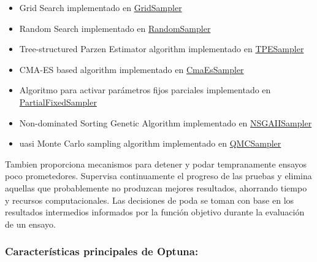 \documentclass[11pt]{article}
\providecommand{\tightlist}{%
      \setlength{\itemsep}{0pt}\setlength{\parskip}{0pt}}
\begin{document}
\begin{itemize}
\tightlist
\item
  Grid Search implementado en
  \href{https://optuna.readthedocs.io/en/stable/reference/samplers/generated/optuna.samplers.GridSampler.html\#optuna.samplers.GridSampler}{GridSampler}
\item
  Random Search implementado en
  \href{https://optuna.readthedocs.io/en/stable/reference/samplers/generated/optuna.samplers.RandomSampler.html\#optuna.samplers.RandomSampler}{RandomSampler}
\item
  Tree-structured Parzen Estimator algorithm implementado en
  \href{https://optuna.readthedocs.io/en/stable/reference/samplers/generated/optuna.samplers.TPESampler.html\#optuna.samplers.TPESampler}{TPESampler}
\item
  CMA-ES based algorithm implementado en
  \href{https://optuna.readthedocs.io/en/stable/reference/samplers/generated/optuna.samplers.CmaEsSampler.html\#optuna.samplers.CmaEsSampler}{CmaEsSampler}
\item
  Algoritmo para activar parámetros fijos parciales implementado en
  \href{https://optuna.readthedocs.io/en/stable/reference/samplers/generated/optuna.samplers.PartialFixedSampler.html\#optuna.samplers.PartialFixedSampler}{PartialFixedSampler}
\item
  Non-dominated Sorting Genetic Algorithm implementado en
  \href{https://optuna.readthedocs.io/en/stable/reference/samplers/generated/optuna.samplers.NSGAIISampler.html\#optuna.samplers.NSGAIISampler}{NSGAIISampler}
\item
  uasi Monte Carlo sampling algorithm implementado en
  \href{https://optuna.readthedocs.io/en/stable/reference/samplers/generated/optuna.samplers.QMCSampler.html\#optuna.samplers.QMCSampler}{QMCSampler}
\end{itemize}

    Tambien proporciona mecanismos para detener y podar tempranamente
ensayos poco prometedores. Supervisa continuamente el progreso de las
pruebas y elimina aquellas que probablemente no produzcan mejores
resultados, ahorrando tiempo y recursos computacionales. Las decisiones
de poda se toman con base en los resultados intermedios informados por
la función objetivo durante la evaluación de un ensayo.

    \hypertarget{caracteruxedsticas-principales-de-optuna}{%
\subsubsection{Características principales de
Optuna:}\label{caracteruxedsticas-principales-de-optuna}}
\end{document}
